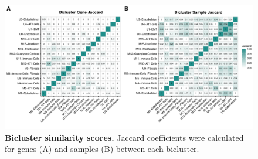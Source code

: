 \documentclass[
]{article}
\begin{document}
\begin{figure}
\includegraphics[width=1\linewidth,]{./Figures/SysReview/FigE9_biclusterjaccard} \caption[Bicluster similarity]{\textbf{Bicluster similarity scores.} Jaccard coefficients were calculated for genes (A) and samples (B) between each bicluster.}\label{fig:biclusterjaccard}
\end{figure}
\end{document}
